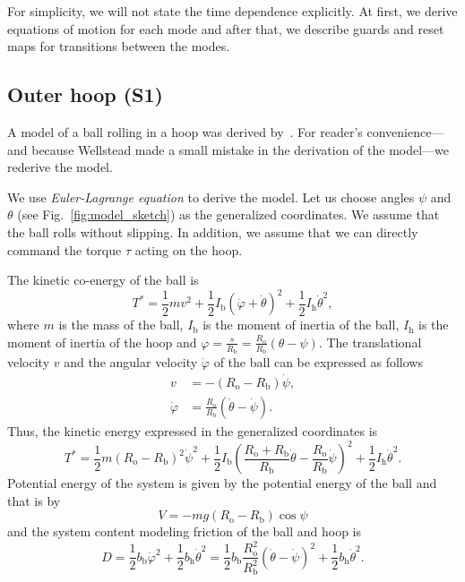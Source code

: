 \documentclass{ifacconf}
\begin{document}
For simplicity, we will not state the time dependence explicitly. At first, we derive equations of motion for each mode and after that, we describe guards and reset maps for transitions between the modes.

\subsection{Outer hoop (S1)} %
\label{sub:outer_hoop}
A model of a ball rolling in a hoop was derived by~\cite{Wellstead1983Ball}. For reader's convenience---and because Wellstead made a small mistake in the derivation of the model---we rederive the model.

We use \textit{Euler-Lagrange equation} to derive the model. Let us choose angles $\psi$ and $\theta$ (see Fig.~\ref{fig:model_sketch}) as the generalized coordinates. We assume that the ball rolls without slipping. In addition, we assume that we can directly command the torque $\tau$ acting on the hoop.

The kinetic co-energy of the ball is
\begin{equation}
  T^\ast = \frac{1}{2} mv^2 + \frac{1}{2}I_\mathrm{b}(\dot{\varphi} + \dot{\theta})^2 + \frac{1}{2}I_\mathrm{h}\dot{\theta}^2,
\end{equation}
where $m$ is the mass of the ball, $I_\mathrm{b}$ is the moment of inertia of the ball, $I_\mathrm{h}$ is the moment of inertia of the hoop and $\varphi=\frac{s}{R_\mathrm{b}}=\frac{R_\mathrm{o}}{R_\mathrm{b}}(\theta-\psi)$. The translational velocity $v$ and the angular velocity $\dot{\varphi}$ of the ball can be expressed as follows
\begin{subequations}
\label{eq:kinematicConstraints}
  \begin{align}
  \label{eq:kinematicConstraints_vt}
    v &= -\left(R_\mathrm{o}-R_\mathrm{b}\right)\dot{\psi}, \\
  \label{eq:kinematicConstraints_phi}
    \dot{\varphi} &= \frac{R_\mathrm{o}}{R_\mathrm{b}}\left(\dot{\theta} - \dot{\psi}\right).  
  \end{align}
\end{subequations}
Thus, the kinetic energy expressed in the generalized coordinates is 
\begin{equation}
  T^\ast = \frac{1}{2} m\left(R_\mathrm{o}-R_\mathrm{b}\right)^2\dot{\psi}^2
  +
  \frac{1}{2}I_\mathrm{b}\left(\frac{R_\mathrm{o}+R_\mathrm{b}}{R_\mathrm{b}}\dot{\theta} - \frac{R_\mathrm{o}}{R_\mathrm{b}}\dot{\psi}\right)^2
  +
  \frac{1}{2}I_\mathrm{h}\dot{\theta}^2.
\end{equation}
Potential energy of the system is given by the potential energy of the ball and that is by
\begin{equation}
  V = -mg\left(R_\mathrm{o}-R_\mathrm{b}\right)\cos\psi
\end{equation}
and the system content modeling friction of the ball and hoop is
\begin{equation}
  D = \frac{1}{2}b_\mathrm{b}\dot{\varphi}^2 + \frac{1}{2}b_\mathrm{h}\dot{\theta}^2=\frac{1}{2}b_\mathrm{b}\frac{R_\mathrm{o}^2}{R_\mathrm{b}^2}\left(\dot{\theta} - \dot{\psi}\right)^2 + \frac{1}{2}b_\mathrm{h}\dot{\theta}^2.
\end{equation}
\end{document}
